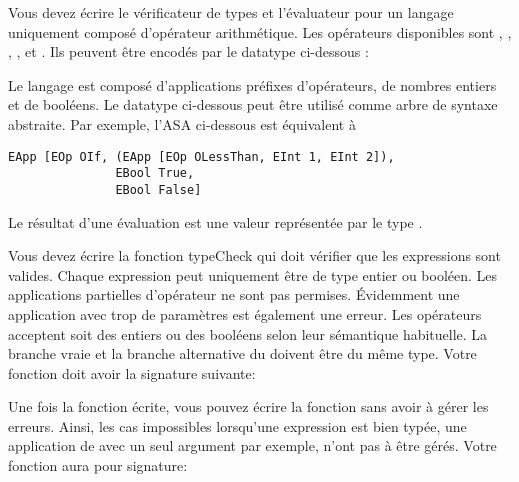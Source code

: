 \begin{Exercise}[title={Calculatrice en Haskell --  2}]
  \label{ex:calculatrice2}
Vous devez écrire le vérificateur de types et l'évaluateur pour un
langage uniquement composé d'opérateur arithmétique. Les opérateurs
disponibles sont \codeinline{+}, \codeinline{-}, \codeinline{==},
\codeinline{<},  et . Ils peuvent être
encodés par le datatype ci-dessous : 

Le langage est composé d'applications préfixes d'opérateurs, de nombres
entiers et de booléens. Le datatype  ci-dessous peut
être utilisé comme arbre de syntaxe abstraite.  
Par exemple, l'ASA ci-dessous est équivalent à 
\begin{verbatim}
EApp [EOp OIf, (EApp [EOp OLessThan, EInt 1, EInt 2]), 
               EBool True, 
               EBool False]
\end{verbatim}

Le résultat d'une évaluation est une valeur représentée par le type
. 

Vous devez écrire la fonction typeCheck qui doit vérifier que les
expressions sont valides. Chaque expression peut uniquement être de
type entier ou booléen.
 Les
applications partielles d'opérateur ne sont pas permises. Évidemment
une application avec trop de paramètres est également une erreur. Les
opérateurs acceptent soit des entiers ou des booléens selon leur
sémantique habituelle. La branche vraie et la branche alternative du
 doivent être du même type. Votre fonction
 doit avoir la signature suivante:

Une fois la fonction  écrite, vous pouvez écrire
la fonction  sans avoir à gérer les erreurs. Ainsi,
les cas impossibles lorsqu'une expression est bien typée, une
application de \codeinline{+} avec un seul argument par exemple, n'ont
pas à être gérés. Votre fonction  aura pour signature:
\end{Exercise}

\begin{Answer}[ref={ex:calculatrice2}]
\end{Answer}